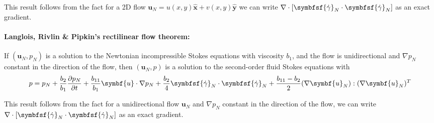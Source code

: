 \documentclass{jknotes}
\begin{document}
This result follows from the fact for a 2D flow $\symbf{u}_N = u(x,y)\hat{\symbf{x}} +
v(x,y) \hat{\symbf{y}}$ we can write $\nabla \cdot \left[ \symbfsf{\srate}_N
\cdot \symbfsf{\srate}_N\right]$ as an exact gradient.

\paragraph{Langlois, Rivlin \& Pipkin's rectilinear flow theorem:} If
$(\symbf{u}_N, p_N)$ is a solution to the Newtonian incompressible Stokes
equations with viscosity $b_1$, and the flow is unidirectional and $\nabla
p_N$ constant in the direction of the flow, then $(\symbf{u}_N, p)$ is a
solution to the second-order fluid Stokes equations with
\begin{equation}
	p = p_N + \frac{b_2}{b_1} \frac{\partial p_N}{\partial t} +
	\frac{b_{11}}{b_1} \symbf{u} \cdot \nabla p_N + \frac{b_2}{4}
	\symbfsf{\srate}_N \cdot \symbfsf{\srate}_N + \frac{b_{11}-b_2}{2} (\nabla
	\symbf{u}_N) : (\nabla \symbf{u}_N)^T
\end{equation}

This result follows from the fact for a unidirectional flow $\symbf{u}_N$ and
$\nabla p_N$ constant in the direction of the flow, we can write $\nabla \cdot
\left[ \symbfsf{\srate}_N \cdot \symbfsf{\srate}_N\right]$ as an exact
gradient.

\end{document}
